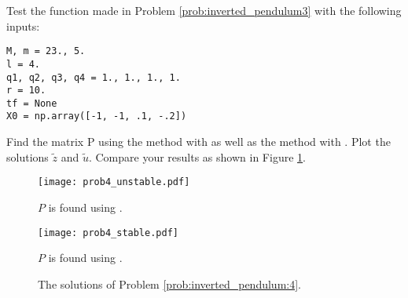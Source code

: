 \begin{problem}
Test the function made in Problem \eqref{prob:inverted_pendulum3} with the following inputs: 
\begin{lstlisting}
M, m = 23., 5.
l = 4.
q1, q2, q3, q4 = 1., 1., 1., 1.
r = 10.
tf = None
X0 = np.array([-1, -1, .1, -.2])
\end{lstlisting}
Find the matrix P using the  method with  as well as the  method with .
Plot the solutions $\tilde{z}$ and $\tilde{u}$. 
Compare your results as shown in Figure \ref{fig:inverted_pendulum:4}.
\label{prob:inverted_pendulum:4}
\end{problem}

\begin{figure}
\begin{minipage}[b]{.47\linewidth}
\centering
\texttt{[image: prob4\_unstable.pdf]}
\caption*{$P$ is found using .}
\end{minipage}
\hspace{0.5cm}
\begin{minipage}[b]{0.47\linewidth}
\centering
\texttt{[image: prob4\_stable.pdf]}
\caption*{$P$ is found using .}
\end{minipage}
\caption{The solutions of Problem \ref{prob:inverted_pendulum:4}.}
\label{fig:inverted_pendulum:4}
\end{figure}

\begin{comment}
\begin{problem}
Consider the following inputs: 
\begin{lstlisting}
M, m = 23., 5.
l = 4.
q1, q2, q3, q4 = 1., 1., 1., 1.
r = 10.
tf = 60
X0 = np.array([-1, -1, .1, -.2])
\end{lstlisting}
Vary the entries of \li{X0} responsible for $\theta(0)$ and $\dot{\theta}(0)$ to determine the sensitivity of the control $u$ to the initial conditions.  What initial conditions lead to a reasonable, physical control $u$? (Plot several solutions with various values of $\theta(0)$ and $\dot{\theta}(0)$.)
\end{problem}
\end{comment}